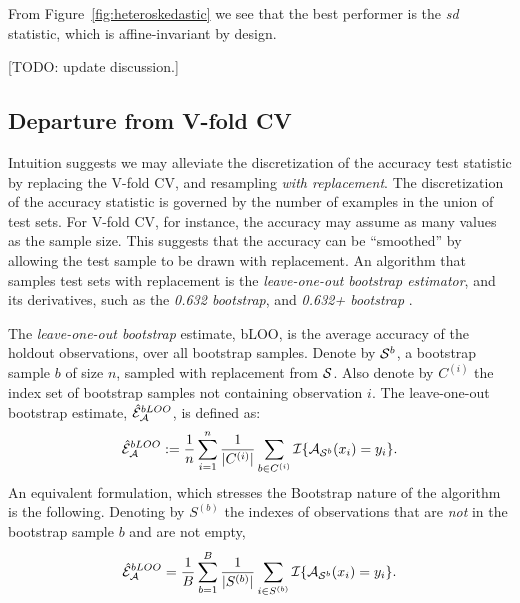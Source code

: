 \documentclass[12pt,a4paper]{article}
\begin{document}
From Figure~\ref{fig:heteroskedastic} we see that the best performer is the \emph{sd} statistic, which is affine-invariant by design. 


[TODO: update discussion.]







\subsection{Departure from V-fold CV}
\label{sec:bootstrap}

Intuition suggests we may alleviate the discretization of the accuracy test statistic by replacing the V-fold CV, and resampling \emph{with replacement}.
The discretization of the accuracy statistic is governed by the number of examples in the union of test sets.
For V-fold CV, for instance, the accuracy may assume as many values as the sample size. 
This suggests that the accuracy can be ``smoothed'' by allowing the test sample to be drawn with replacement. 
An algorithm that samples test sets with replacement is the \emph{leave-one-out bootstrap estimator},  and its derivatives, such as the \emph{0.632 bootstrap}, and \emph{0.632+ bootstrap} \citep[Sec 7.11]{hastie_elements_2003}.
\begin{definition}[bLOO]
	\label{def:bloo}
	The \emph{leave-one-out bootstrap} estimate, bLOO, is the average accuracy of the holdout observations, over all bootstrap samples. 
	Denote by $\mathcal{S}^b$, a bootstrap sample $b$ of size $n$, sampled with replacement from $\mathcal{S}$. 
	Also denote by $C^{(i)}$ the index set of bootstrap samples not containing observation $i$.
	The leave-one-out bootstrap estimate, $\hat{\mathcal{E}}_{\mathcal{A}}^{bLOO}$,  is defined as:
	\begin{align}
	\hat{\mathcal{E}}_{\mathcal{A}}^{bLOO}:= \frac 1n \sum_{i=1}^{n} \frac{1}{|C^{(i)}|} \sum_{b \in C^{(i)}} \mathcal{I}{\{ \mathcal{A}_{\mathcal{S}^b}(x_i)=y_i \}}.
	\end{align}
	An equivalent formulation, which stresses the Bootstrap nature of the algorithm is the following. 
	Denoting by $S^{(b)}$ the indexes of observations that are \emph{not} in the bootstrap sample $b$ and are not empty, 
	\begin{align}
	\hat{\mathcal{E}}_{\mathcal{A}}^{bLOO} = \frac 1B \sum_{b=1}^{B} \frac{1}{|S^{(b)}|} \sum_{i \in S^{(b)}} \mathcal{I}{\{ \mathcal{A}_{\mathcal{S}^b}(x_i)=y_i \}}.
	\end{align}
\end{definition}
\end{document}
